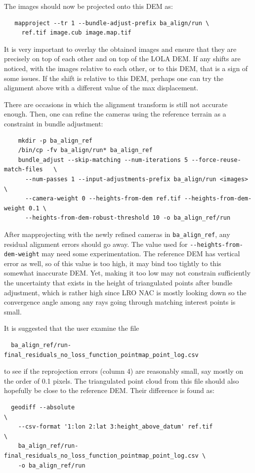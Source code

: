 The images should now be projected onto this DEM as:

\begin{verbatim}
   mapproject --tr 1 --bundle-adjust-prefix ba_align/run \
     ref.tif image.cub image.map.tif
\end{verbatim}

It is very important to overlay the obtained images and ensure that they
are precisely on top of each other and on top of the LOLA DEM. If any
shifts are noticed, with the images relative to each other, or to this
DEM, that is a sign of some issues.  If the shift is relative to this
DEM, perhaps one can try the alignment above with a different value of
the max displacement.

There are occasions in which the alignment transform is still not accurate
enough. Then, one can refine the cameras using the reference terrain as
a constraint in bundle adjustment:

\begin{verbatim}
    mkdir -p ba_align_ref
    /bin/cp -fv ba_align/run* ba_align_ref
    bundle_adjust --skip-matching --num-iterations 5 --force-reuse-match-files   \
      --num-passes 1 --input-adjustments-prefix ba_align/run <images>            \
      --camera-weight 0 --heights-from-dem ref.tif --heights-from-dem-weight 0.1 \
      --heights-from-dem-robust-threshold 10 -o ba_align_ref/run
\end{verbatim}

After mapprojecting with the newly refined cameras in \texttt{ba\_align\_ref},
any residual alignment errors should go away. The value used for
\texttt{-\/-heights-from-dem-weight} may need some experimentation. The reference
DEM has vertical error as well, so of this value is too high, it may bind too
tightly to this somewhat inaccurate DEM. Yet, making it too low may not
constrain sufficiently the uncertainty that exists in the height of triangulated
points after bundle adjustment, which is rather high since LRO NAC is mostly looking
down so the convergence angle among any rays going through matching interest points
is small.

It is suggested that the user examine the file
\begin{verbatim}
  ba_align_ref/run-final_residuals_no_loss_function_pointmap_point_log.csv
\end{verbatim}

to see if the reprojection errors (column 4) are reasonably small, say mostly
on the order of 0.1 pixels. The triangulated point cloud
from this file should also hopefully be close to the reference DEM. Their
difference is found as:
\begin{verbatim}
  geodiff --absolute                                                         \
    --csv-format '1:lon 2:lat 3:height_above_datum' ref.tif                  \
    ba_align_ref/run-final_residuals_no_loss_function_pointmap_point_log.csv \
    -o ba_align_ref/run
\end{verbatim}


